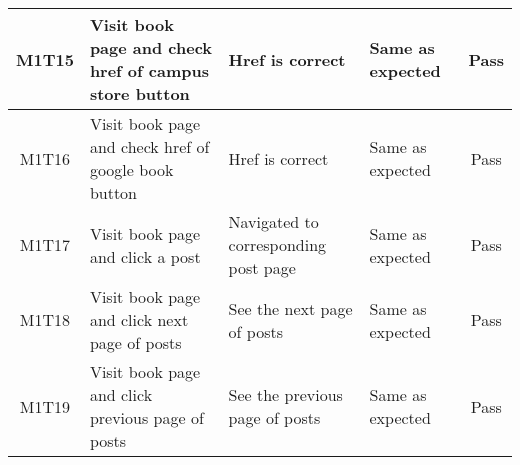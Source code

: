 \documentclass[fullpage]{article}
\begin{document}
\begin{table}[H]
\begin{tabular}{|c|p{4.5cm}|p{3.6cm}|p{3.6cm}|c|}
\hline
M1T15 & Visit book page and check href of campus store button & Href is correct & Same as expected & Pass \\
\hline
M1T16 & Visit book page and check href of google book button & Href is correct & Same as expected & Pass \\
\hline
M1T17 & Visit book page and click a post & Navigated to corresponding post page & Same as expected & Pass \\
\hline
M1T18 & Visit book page and click next page of posts & See the next page of posts & Same as expected & Pass \\
\hline
M1T19 & Visit book page and click previous page of posts & See the previous page of posts & Same as expected & Pass \\
\hline
\end{tabular}
\end{table}
\end{document}
